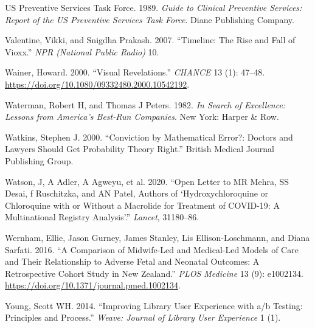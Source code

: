 \documentclass[
  10pt,
  b5paper]{book}
\newlength{\cslhangindent}
\newlength{\cslentryspacingunit} %
\newenvironment{CSLReferences}[2] %
 {%
  \setlength{\parindent}{0pt}
  \ifodd #1
  \let\oldpar\par
  \def\par{\hangindent=\cslhangindent\oldpar}
  \fi
  \setlength{\parskip}{#2\cslentryspacingunit}
 }%
 {}
\begin{document}
\begin{CSLReferences}{1}{0}
\leavevmode{}%
US Preventive Services Task Force. 1989. \emph{Guide to Clinical Preventive Services: Report of the US Preventive Services Task Force}. Diane Publishing Company.

\leavevmode{}%
Valentine, Vikki, and Snigdha Prakash. 2007. {``Timeline: The Rise and Fall of Vioxx.''} \emph{NPR (National Public Radio)} 10.

\leavevmode{}%
Wainer, Howard. 2000. {``Visual Revelations.''} \emph{CHANCE} 13 (1): 47--48. \url{https://doi.org/10.1080/09332480.2000.10542192}.

\leavevmode{}%
Waterman, Robert H, and Thomas J Peters. 1982. \emph{In Search of Excellence: Lessons from America's Best-Run Companies}. New York: Harper \& Row.

\leavevmode{}%
Watkins, Stephen J. 2000. {``Conviction by Mathematical Error?: Doctors and Lawyers Should Get Probability Theory Right.''} British Medical Journal Publishing Group.

\leavevmode{}%
Watson, J, A Adler, A Agweyu, et al. 2020. {``Open Letter to MR Mehra, SS Desai, f Ruschitzka, and AN Patel, Authors of {`Hydroxychloroquine or Chloroquine with or Without a Macrolide for Treatment of COVID-19: A Multinational Registry Analysis'}.''} \emph{Lancet}, 31180--86.

\leavevmode{}%
Wernham, Ellie, Jason Gurney, James Stanley, Lis Ellison-Loschmann, and Diana Sarfati. 2016. {``A Comparison of Midwife-Led and Medical-Led Models of Care and Their Relationship to Adverse Fetal and Neonatal Outcomes: A Retrospective Cohort Study in New Zealand.''} \emph{PLOS Medicine} 13 (9): e1002134. \url{https://doi.org/10.1371/journal.pmed.1002134}.

\leavevmode{}%
Young, Scott WH. 2014. {``Improving Library User Experience with a/b Testing: Principles and Process.''} \emph{Weave: Journal of Library User Experience} 1 (1).

\end{CSLReferences}

\newpage
\end{document}
